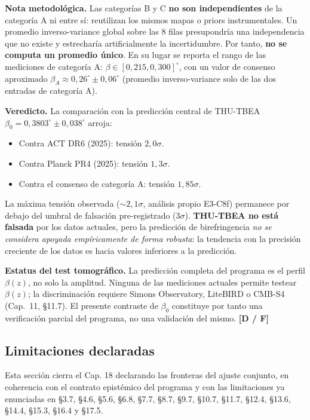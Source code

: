 ﻿\documentclass[11pt,letterpaper]{article}
\begin{document}
\textbf{Nota metodológica.} Las categorías B y C \textbf{no son independientes}
de la categoría A ni entre sí: reutilizan los mismos mapas o priors
instrumentales. Un promedio inverso-variance global sobre las 8 filas
presupondría una independencia que no existe y estrecharía artificialmente
la incertidumbre. Por tanto, \textbf{no se computa un promedio único}.
En su lugar se reporta el rango de las mediciones de categoría A:
$\beta \in [0{,}215, 0{,}300]^\circ$, con un valor de consenso
aproximado $\beta_A \approx 0{,}26^\circ \pm 0{,}06^\circ$ (promedio
inverso-variance solo de las dos entradas de categoría A).

\textbf{Veredicto.} La comparación con la predicción central de THU-TBEA
$\beta_0 = 0{,}3803^\circ \pm 0{,}038^\circ$ arroja:
\begin{itemize}[leftmargin=*]
\item Contra ACT DR6 (2025): tensión $2{,}0\sigma$.
\item Contra Planck PR4 (2025): tensión $1{,}3\sigma$.
\item Contra el consenso de categoría A: tensión $1{,}85\sigma$.
\end{itemize}
La máxima tensión observada ($\sim 2{,}1\sigma$, análisis propio E3-C8f)
permanece por debajo del umbral de falsación pre-registrado ($3\sigma$).
\textbf{THU-TBEA no está falsada} por los datos actuales, pero la
predicción de birefringencia \emph{no se considera apoyada empíricamente
de forma robusta}: la tendencia con la precisión creciente de los datos
es hacia valores inferiores a la predicción.

\textbf{Estatus del test tomográfico.} La predicción completa del
programa es el perfil $\beta(z)$, no solo la amplitud. Ninguna de las
mediciones actuales permite testear $\beta(z)$; la discriminación
requiere Simons Observatory, LiteBIRD o CMB-S4 (Cap.~11, §11.7). El
presente contraste de $\beta_0$ constituye por tanto una verificación
parcial del programa, no una validación del mismo. \textbf{[D / F]}

\subsection{Limitaciones declaradas}
Esta sección cierra el Cap. 18 declarando las fronteras del ajuste conjunto, en coherencia con el contrato epistémico del programa y con las limitaciones ya enunciadas en §3.7, §4.6, §5.6, §6.8, §7.7, §8.7, §9.7, §10.7, §11.7, §12.4, §13.6, §14.4, §15.3, §16.4 y §17.5.
\end{document}
